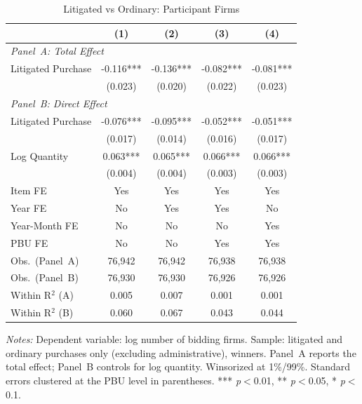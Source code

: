 \begin{table}[ht]
  \centering
  \caption{Litigated vs Ordinary: Participant Firms}
  \label{tab:t2_lit_firms}
  \small
  \begin{threeparttable}
  \begin{tabular}{lcccc}
    \hline\hline
    & (1) & (2) & (3) & (4) \\
    \hline
    \multicolumn{5}{l}{\textit{Panel~A: Total Effect}} \\[3pt]
    Litigated Purchase & -0.116*** & -0.136*** & -0.082*** & -0.081*** \\
     & (0.023) & (0.020) & (0.022) & (0.023) \\[3pt]
    \hline
    \multicolumn{5}{l}{\textit{Panel~B: Direct Effect}} \\[3pt]
    Litigated Purchase & -0.076*** & -0.095*** & -0.052*** & -0.051*** \\
     & (0.017) & (0.014) & (0.016) & (0.017) \\[3pt]
    Log Quantity & 0.063*** & 0.065*** & 0.066*** & 0.066*** \\
     & (0.004) & (0.004) & (0.003) & (0.003) \\[3pt]
    \hline
    Item FE & Yes & Yes & Yes & Yes \\
    Year FE & No & Yes & Yes & No \\
    Year-Month FE & No & No & No & Yes \\
    PBU FE & No & No & Yes & Yes \\
    Obs.\ (Panel~A) & 76,942 & 76,942 & 76,938 & 76,938 \\
    Obs.\ (Panel~B) & 76,930 & 76,930 & 76,926 & 76,926 \\
    Within R$^2$ (A) & 0.005 & 0.007 & 0.001 & 0.001 \\
    Within R$^2$ (B) & 0.060 & 0.067 & 0.043 & 0.044 \\
    \hline\hline
  \end{tabular}
  \begin{tablenotes}
    \small
    \item \textit{Notes:} Dependent variable: log number of bidding firms. Sample: litigated and ordinary purchases only (excluding administrative), winners. Panel~A reports the total effect; Panel~B controls for log quantity. Winsorized at 1\%/99\%. Standard errors clustered at the PBU level in parentheses. *** \textit{p}$<$0.01, ** \textit{p}$<$0.05, * \textit{p}$<$0.1.
  \end{tablenotes}
  \end{threeparttable}
\end{table}
